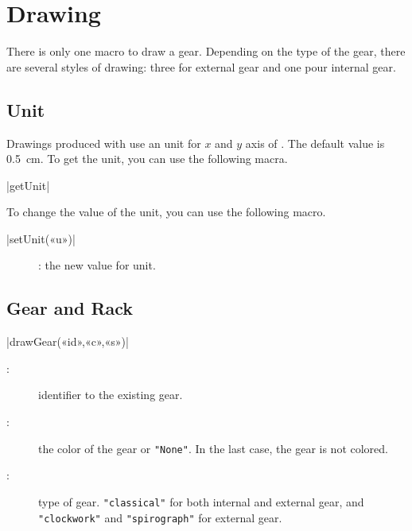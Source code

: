 \documentclass[english]{ltxdoc}
\begin{document}
\section{Drawing}\label{sec:drawing}

There is only one macro to draw a gear. Depending on the type of the gear, there
are several styles of drawing: three for external gear and one pour internal
gear. 

\subsection{Unit}

Drawings produced with \mpgears use an unit for $x$ and $y$ axis of
. The default value is \SI{0.5}{cm}. To get the unit, you can
use the following macra.
\begin{colourband}
\commande|getUnit|\smallskip{}
\end{colourband}

To change the value of the \mpgears unit, you can use the following macro. 
\begin{colourband}
\commande|setUnit(«u»)|\smallskip{}
\begin{description}
  \item[]:  the new value for \mpgears unit. 
\end{description}
\end{colourband}




\subsection{Gear and Rack}

\begin{colourband}
\commande|drawGear(«id»,«c»,«s»)|\smallskip{}
\begin{description}
  \item[:]  identifier to the existing gear.
  \item[:]  the color of the gear or 
  \lstinline+"None"+. In the last case, the gear is not colored.
  \item[:]  type of gear. \lstinline+"classical"+ for both
  internal and external gear, and \lstinline+"clockwork"+ and
  \lstinline+"spirograph"+ for external gear.
\end{description}
\end{colourband}
\end{document}
